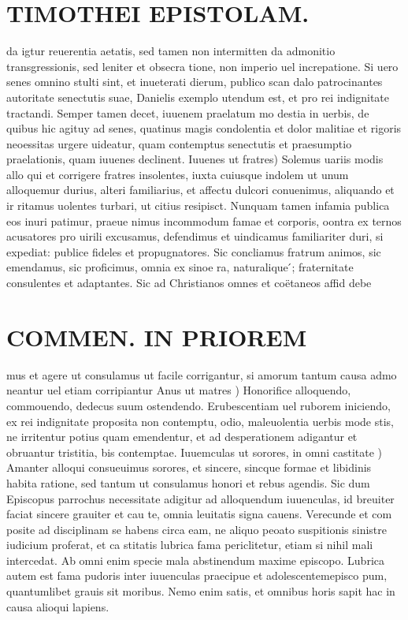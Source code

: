 \documentclass{article}
\begin{document}
\begin{pages}
\section*{TIMOTHEI EPISTOLAM. }
\marginpar{[ p.115 ]}\pstart da igtur reuerentia aetatis, sed tamen non intermitten da admonitio transgressionis, sed leniter et obsecra tione, non imperio uel increpatione. Si uero senes omnino stulti sint, et inueterati dierum, publico scan dalo patrocinantes autoritate senectutis suae, Danielis exemplo utendum est, et pro rei indignitate tractandi. Semper tamen decet, iuuenem praelatum mo destia in uerbis, de quibus hic agituy ad senes, quatinus magis condolentia et dolor malitiae et rigoris neoessitas urgere uideatur, quam contemptus senectutis et praesumptio praelationis, quam iuuenes declinent.  \pend\pstart Iuuenes ut fratres) Solemus uariis modis allo qui et corrigere fratres insolentes, iuxta cuiusque indolem ut unum alloquemur durius, alteri familiarius, et affectu dulcori conuenimus, aliquando et ir ritamus uolentes turbari, ut citius resipisct. Nunquam tamen infamia publica eos inuri patimur, praeue nimus incommodum famae et corporis, oontra ex ternos acusatores pro uirili excusamus, defendimus et uindicamus familiariter duri, si expediat: publice fideles et propugnatores. Sic concliamus fratrum animos, sic emendamus, sic proficimus, omnia ex sinoe ra, naturalique ́; fraternitate consulentes et adaptantes. Sic ad Christianos omnes et coëtaneos affid debe\pend
\section*{COMMEN. IN PRIOREM }
\marginpar{[ p.116 ]}\pstart mus et agere ut consulamus ut facile corrigantur, si amorum tantum causa admo neantur uel etiam corripiantur  \pend\pstart Anus ut matres ) Honorifice alloquendo, commouendo, dedecus suum ostendendo. Erubescentiam uel ruborem iniciendo, ex rei indignitate proposita non contemptu, odio, maleuolentia uerbis mode stis, ne irritentur potius quam emendentur, et ad desperationem adigantur et obruantur tristitia, bis contemptae.  \pend\pstart Iuuemculas ut sorores, in omni castitate ) Amanter alloqui consueuimus sorores, et sincere, sincque formae et libidinis habita ratione, sed tantum ut consulamus honori et rebus agendis. Sic dum Episcopus parrochus necessitate adigitur ad alloquendum iuuenculas, id breuiter faciat sincere grauiter et cau te, omnia leuitatis signa cauens. Verecunde et com posite ad disciplinam se habens circa eam, ne aliquo peoato suspitionis sinistre iudicium proferat, et ca stitatis lubrica fama periclitetur, etiam si nihil mali intercedat. Ab omni enim specie mala abstinendum maxime episcopo. Lubrica autem est fama pudoris inter iuuenculas praecipue et adolescentemepisco pum, quantumlibet grauis sit moribus. Nemo enim satis, et omnibus horis sapit hac in causa alioqui lapiens.  \pend

\end{pages}
\end{document}

